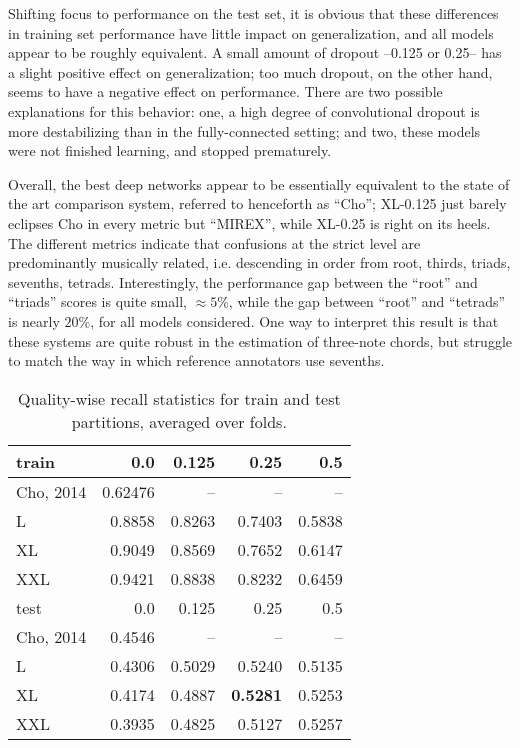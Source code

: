 Shifting focus to performance on the test set, it is obvious that these differences in training set performance have little impact on generalization, and all models appear to be roughly equivalent.
A small amount of dropout --0.125 or 0.25-- has a slight positive effect on generalization; too much dropout, on the other hand, seems to have a negative effect on performance.
There are two possible explanations for this behavior:
one, a high degree of convolutional dropout is more destabilizing than in the fully-connected setting;
and two, these models were not finished learning, and stopped prematurely.

Overall, the best deep networks appear to be essentially equivalent to the state of the art comparison system, referred to henceforth as ``Cho''; XL-0.125 just barely eclipses Cho in every metric but ``MIREX'', while XL-0.25 is right on its heels.
The different metrics indicate that confusions at the strict level are predominantly musically related, i.e. descending in order from root, thirds, triads, sevenths, tetrads.
Interestingly, the performance gap between the ``root'' and ``triads'' scores is quite small, $\approx 5\%$, while the gap between ``root'' and ``tetrads'' is nearly $20\%$, for all models considered.
One way to interpret this result is that these systems are quite robust in the estimation of three-note chords, but struggle to match the way in which reference annotators use sevenths.


\begin{table}[t]
\begin{center}
\caption{Quality-wise recall statistics for train and test partitions, averaged over folds.}
\label{tab:qwise_macro_recall}
\begin{tabular}{l|rrrr}
\hline
 train   &    0.0 &   0.125 &   0.25 &    0.5 \\
\hline
Cho, 2014 & 0.62476 & -- & -- & -- \\
 L       & 0.8858 &  0.8263 & 0.7403 & 0.5838 \\
 XL      & 0.9049 &  0.8569 & 0.7652 & 0.6147 \\
 XXL     & 0.9421 &  0.8838 & 0.8232 & 0.6459 \\
\hline
 test   &    0.0 &   0.125 &   0.25 &    0.5 \\
\hline
 Cho, 2014 & 0.4546 & -- & -- & --  \\
 L      & 0.4306 &  0.5029 & 0.5240 & 0.5135 \\
 XL     & 0.4174 &  0.4887 & \textbf{0.5281} & 0.5253 \\
 XXL    & 0.3935 &  0.4825 & 0.5127 & 0.5257 \\
\hline
\end{tabular}
\end{center}
\end{table}

